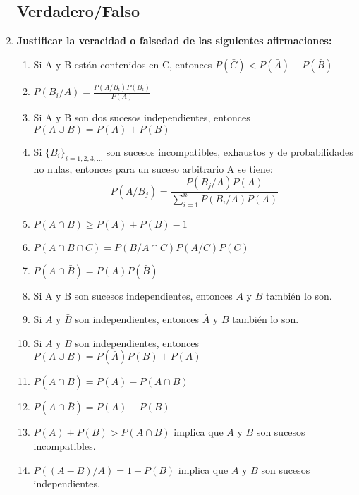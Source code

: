 \documentclass[fleqn]{article}
\begin{document}
        \begin{enumerate}
                \subsection{Verdadero/Falso}
                \item \textbf{Justificar la veracidad o falsedad de las siguientes afirmaciones:}

                        \begin{enumerate}
                                \item Si A y B están contenidos en C, entonces $P(\bar{C}) < P(\bar{A}) + P(\bar{B})$
                                \item $P(B_i/A) = \frac{P(A / B_i)P(B_i)}{P(A)}$
                                \item Si A y B son dos sucesos independientes, entonces $P(A\cup B) = P(A) + P(B)$
                                \item Si $\{B_i\}_{i=1,2,3,...}$ son sucesos incompatibles, exhaustos y de probabilidades no nulas, entonces para un suceso
                                        arbitrario A se tiene:
                                        $$P(A / B_j) = \frac{P(B_j / A) P(A)}{\sum_{i=1}^n P(B_i / A)P(A)}$$
                                \item $P(A \cap B) \geq P(A) + P(B) - 1$
                                \item $P(A\cap B \cap C) = P(B/A\cap C) P(A/C) P(C)$
                                \item $P(A \cap \bar{B}) = P(A)P(\bar{B})$
                                \item Si A y B son sucesos independientes, entonces $\bar{A}$ y $\bar{B}$ también lo son.
                                \item Si $A$ y $\bar{B}$ son independientes, entonces $\bar{A}$ y $B$ también lo son.
                                \item Si $\bar{A}$ y $B$ son independientes, entonces $P(A\cup B) = P(\bar{A})P(B) + P(A)$
                                \item $P(A \cap \bar{B}) = P(A) - P(A \cap B)$
                                \item $P(A \cap \bar{B}) = P(A) - P(B)$
                                \item $P(A) + P(B) > P(A\cap B)$ implica que $A$ y $B$ son sucesos incompatibles.
                                \item $P((A-B)/A) = 1 - P(B)$ implica que $A$ y $\bar{B}$ son sucesos independientes.

\end{enumerate}
\end{enumerate}
\end{document}
